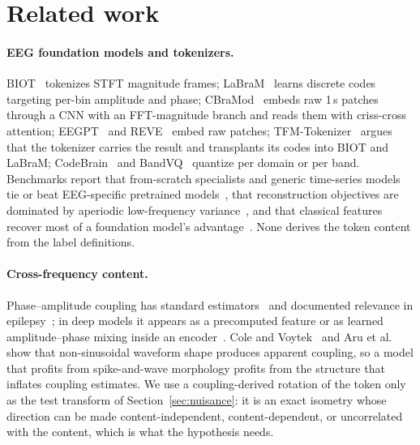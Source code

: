 \section{Related work}
\label{sec:related}

\paragraph{EEG foundation models and tokenizers.}
BIOT~\cite{yang2023biot} tokenizes STFT magnitude frames; LaBraM~\cite{jiang2024labram} learns discrete codes targeting per-bin amplitude and phase; CBraMod~\cite{wang2025cbramod} embeds raw 1\,s patches through a CNN with an FFT-magnitude branch and reads them with criss-cross attention; EEGPT~\cite{wang2024eegpt} and REVE~\cite{elouahidi2025reve} embed raw patches; TFM-Tokenizer~\cite{pradeepkumar2026tfm} argues that the tokenizer carries the result and transplants its codes into BIOT and LaBraM; CodeBrain~\cite{ma2025codebrain} and BandVQ~\cite{sukhbaatar2026bandvq} quantize per domain or per band. Benchmarks report that from-scratch specialists and generic time-series models tie or beat EEG-specific pretrained models~\cite{liu2026compass,kontras2026neuroatlas,xiong2025eegfmbench}, that reconstruction objectives are dominated by aperiodic low-frequency variance~\cite{kommineni2026aperiodic,yu2026fame}, and that classical features recover most of a foundation model's advantage~\cite{tang2026what}. None derives the token content from the label definitions.

\paragraph{Cross-frequency content.}
Phase--amplitude coupling has standard estimators~\cite{tort2010measuring,canolty2006high} and documented relevance in epilepsy~\cite{amiri2016phase,edakawa2016detection}; in deep models it appears as a precomputed feature or as learned amplitude--phase mixing inside an encoder~\cite{zheng2025fapex}. Cole and Voytek~\cite{cole2017brain} and Aru et al.~\cite{aru2015untangling} show that non-sinusoidal waveform shape produces apparent coupling, so a model that profits from spike-and-wave morphology profits from the structure that inflates coupling estimates. We use a coupling-derived rotation of the token only as the test transform of Section~\ref{sec:nuisance}: it is an exact isometry whose direction can be made content-independent, content-dependent, or uncorrelated with the content, which is what the hypothesis needs.

